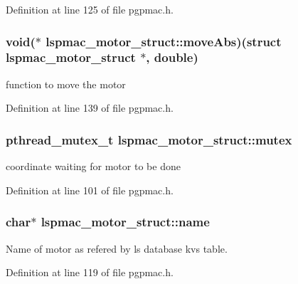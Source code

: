 Definition at line 125 of file pgpmac.\-h.

\hypertarget{structlspmac__motor__struct_a20db3de86854b627815b3d940555ea75}{
\subsubsection[{move\-Abs}]{\setlength{\rightskip}{0pt plus 5cm}void($\ast$ lspmac\-\_\-motor\-\_\-struct\-::move\-Abs)(struct {\bf lspmac\-\_\-motor\-\_\-struct} $\ast$, double)}}\label{structlspmac__motor__struct_a20db3de86854b627815b3d940555ea75}


function to move the motor 



Definition at line 139 of file pgpmac.\-h.

\hypertarget{structlspmac__motor__struct_a188c5b1e991750ce2ffd53e0192e0907}{
\subsubsection[{mutex}]{\setlength{\rightskip}{0pt plus 5cm}pthread\-\_\-mutex\-\_\-t lspmac\-\_\-motor\-\_\-struct\-::mutex}}\label{structlspmac__motor__struct_a188c5b1e991750ce2ffd53e0192e0907}


coordinate waiting for motor to be done 



Definition at line 101 of file pgpmac.\-h.

\hypertarget{structlspmac__motor__struct_aa90af2f6f1489f1befe1d0891e51575a}{
\subsubsection[{name}]{\setlength{\rightskip}{0pt plus 5cm}char$\ast$ lspmac\-\_\-motor\-\_\-struct\-::name}}\label{structlspmac__motor__struct_aa90af2f6f1489f1befe1d0891e51575a}


Name of motor as refered by ls database kvs table. 



Definition at line 119 of file pgpmac.\-h.

